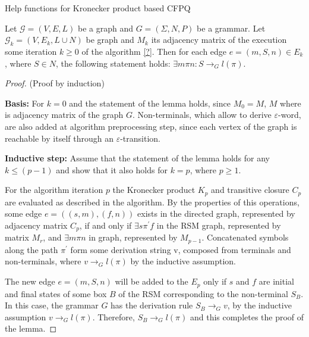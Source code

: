 \begin{algorithm}[h]
\begin{algorithmic}[1]
\footnotesize
\caption{Help functions for Kronecker product based CFPQ}
\label{tensor:cfpq:help}
    \State {}
\EndFunction
{}
    \State {}
\EndFunction
\end{algorithmic}
\end{algorithm}

\begin{lemma}
    \label{lemma:algo:correctness}
    Let $\mathcal{G} = (V,E,L)$ be a graph and $G = (\Sigma, N, P)$ be a grammar.
    Let $\mathcal{G}_k = (V,E_k,L \cup N)$ be graph and $M_k$ its adjacency
    matrix of the execution some iteration $k \geq 0$ of the algorithm \ref{?}.
    Then for each edge $e = (m,S,n) \in E_k$, where $S \in N$,
    the following statement holds: $\exists m\pi n: S \to_{G} l(\pi)$.
\end{lemma}

\begin{proof}{(Proof by induction)}

    \textbf{Basis:} For $k = 0$ and the statement of the lemma holds, since
    $M_0 = M$, $M$ where is adjacency matrix of the graph $G$. Non-terminals,
    which allow to derive $\varepsilon$-word, are also added at algorithm
    preprocessing step, since each vertex of the graph is reachable by itself 
    through an $\varepsilon$-transition.
    
    \textbf{Inductive step:} Assume that the statement of the lemma holds for any
    $k \leq (p - 1)$ and show that it also holds for $k = p$, where $p \geq 1$.
    
    For the algorithm iteration $p$ the Kronecker product $K_p$ and transitive
    closure $C_p$ are evaluated as described in the algorithm. By the properties
    of this operations, some edge $e = ((s,m),(f,n))$ exists in the directed
    graph, represented by adjacency matrix $C_p$, if and only if $\exists s
    \pi ^{'} f$ in the RSM graph, represented by matrix $M_r$, and 
    $\exists m \pi n$ in graph, represented by $M_{p-1}$. Concatenated symbols 
    along the path $\pi^{'}$ form some derivation string v, composed from terminals
    and non-terminals, where $v \to_G l(\pi)$  by the inductive assumption.
    
    The new edge $e = (m,S,n)$ will be added to the $E_p$ only if $s$ and $f$ 
    are initial and final states of some box $B$ of the RSM corresponding to 
    the non-terminal $S_B$. In this case, the grammar $G$ has the derivation rule
    $S_B \to_G v$, by the inductive assumption $v \to_G l(\pi)$. Therefore, 
    $S_B \to_G l(\pi)$ and this completes the proof of the lemma.
    
\end{proof}

